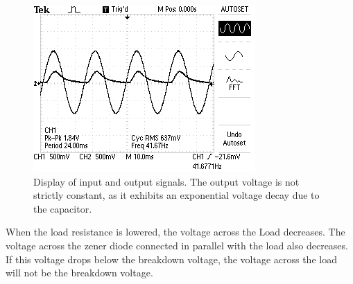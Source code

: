 \documentclass[twocolumn,english]{IEEEtran}
\begin{document}
\begin{figure}[H]
  \begin{centering}
  \begin{center}
  \includegraphics[width=\linewidth]{./DC1.png}
  \caption{Display of input and output signals. The output voltage is not strictly constant, as it exhibits an exponential voltage decay due to the capacitor.}
  \label{fig:DC1}
  \end{center}
  \par\end{centering}
\end{figure}

When the load resistance is lowered, the voltage across the Load decreases. The voltage across the zener diode connected in parallel with the load also decreases. If this voltage drops below the breakdown voltage, the voltage across the load will not be the breakdown voltage.
\end{document}
